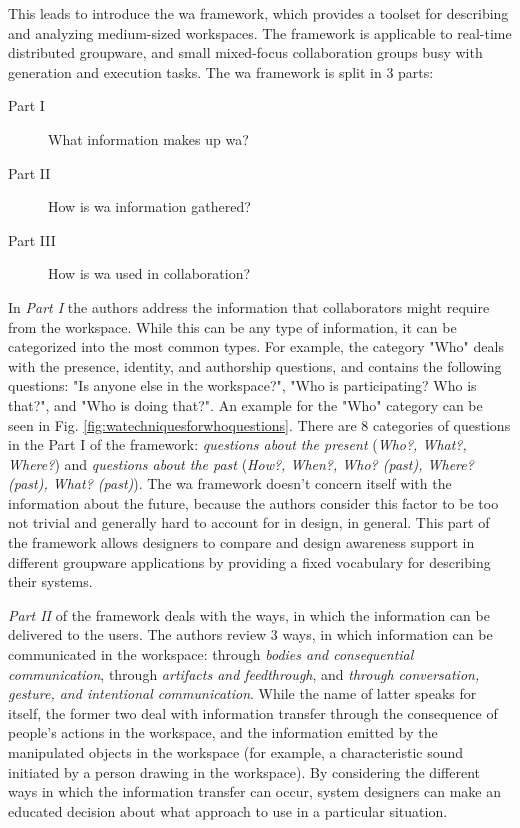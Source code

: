 This leads \parencite{gutwin_descriptive_2002} to introduce the \gls{wa} framework, which provides a toolset for describing and analyzing medium-sized workspaces. The framework is applicable to real-time distributed groupware, and small mixed-focus collaboration groups busy with generation and execution tasks.
The \gls{wa} framework is split in 3 parts:
\begin{description}
	\item[Part I] What information makes up \gls{wa}?
	\item[Part II] How is \gls{wa} information gathered?
	\item[Part III] How is \gls{wa} used in collaboration? 
\end{description}

In \textit{Part I} the authors address the information that collaborators might require from the workspace. While this can be any type of information, it can be categorized into the most common types. For example, the category "Who" deals with the presence, identity, and authorship questions, and contains the following questions: "Is anyone else in the workspace?", "Who is participating? Who is that?", and "Who is doing that?". An example for the "Who" category can be seen in Fig. \ref{fig:watechniquesforwhoquestions}. There are 8 categories of questions in the Part I of the framework: \textit{questions about the present} (\textit{Who?, What?, Where?}) and \textit{questions about the past} (\textit{How?, When?, Who? (past), Where? (past), What? (past)}). The \gls{wa} framework doesn't concern itself with the information about the future, because the authors consider this factor to be too not trivial and generally hard to account for in design, in general.
This part of the framework allows designers to compare and design awareness support in different groupware applications by providing a fixed vocabulary for describing their systems.

\textit{Part II} of the framework deals with the ways, in which the information can be delivered to the users. The authors review 3 ways, in which information can be communicated in the workspace: through \textit{bodies and consequential communication}, through \textit{artifacts and feedthrough}, and \textit{through conversation, gesture, and intentional communication}. While the name of latter speaks for itself, the former two deal with information transfer through the consequence of people's actions in the workspace, and the information emitted by the manipulated objects in the workspace (for example, a characteristic sound initiated by a person drawing in the workspace).
By considering the different ways in which the information transfer can occur, system designers can make an educated decision about what approach to use in a particular situation.

